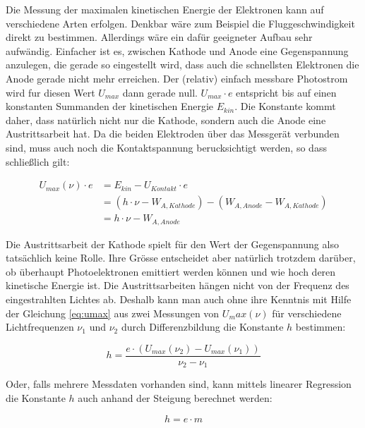 Die  Messung  der  maximalen  kinetischen  Energie  der  Elektronen  kann  auf
verschiedene    Arten   erfolgen.   Denkbar   w\"are    zum    Beispiel    die
Fluggeschwindigkeit  direkt  zu   bestimmen.  Allerdings  w\"are  ein  daf\"ur
geeigneter  Aufbau  sehr aufw\"andig. Einfacher ist es, zwischen  Kathode  und
Anode eine  Gegenspannung anzulegen, die gerade so eingestellt wird, dass auch
die  schnellsten  Elektronen  die  Anode  gerade  nicht  mehr  erreichen.  Der
(relativ) einfach messbare  Photostrom  wird  fur  diesen  Wert $U_{max}$ dann
gerade null. $U_{max}\cdot e$ entspricht bis  auf  einen  konstanten Summanden
der kinetischen Energie $E_{kin}$. Die Konstante kommt daher, dass nat\"urlich
nicht nur die Kathode, sondern auch die Anode eine Austrittsarbeit hat. Da die
beiden Elektroden \"uber das Messger\"at  verbunden  sind,  muss auch noch die
Kontaktspannung    berucksichtigt   werden,   so   dass   schließlich    gilt:

\begin{align}
    U_{max}(\nu)\cdot e &= E_{kin} - U_{Kontakt} \cdot e \\
                        &= \left(h\cdot\nu - W_{A,Kathode}\right) - \left(W_{A,Anode}-W_{A,Kathode}\right) \\
                        &= h\cdot\nu - W_{A,Anode}
    \label{eq:umax}
\end{align}

Die Austrittsarbeit der Kathode spielt f\"ur den Wert  der  Gegenspannung also
tats\"achlich keine Rolle. Ihre Gr\"osse entscheidet aber nat\"urlich trotzdem
dar\"uber,  ob  \"uberhaupt  Photoelektronen emittiert werden k\"onnen und wie
hoch  deren kinetische Energie ist. Die Austrittsarbeiten h\"angen  nicht  von
der  Frequenz  des  eingestrahlten Lichtes ab. Deshalb kann man auch ohne ihre
Kenntnis  mit  Hilfe  der  Gleichung  \ref{eq:umax}  aus  zwei  Messungen  von
$U_max(\nu)$  f\"ur  verschiedene  Lichtfrequenzen  $\nu_1$  und $\nu_2$ durch
Differenzbildung die Konstante $h$ bestimmen:

\begin{equation}
    h = \frac{e\cdot\left(U_{max}(\nu_2) - U_{max}(\nu_1)\right)}{\nu_2 - \nu_1}
\end{equation}

Oder, falls mehrere Messdaten vorhanden sind, kann mittels linearer Regression
die Konstante $h$ auch anhand der Steigung berechnet werden:

\begin{equation}
    h = e \cdot m
    \label{eq:h}
\end{equation}

